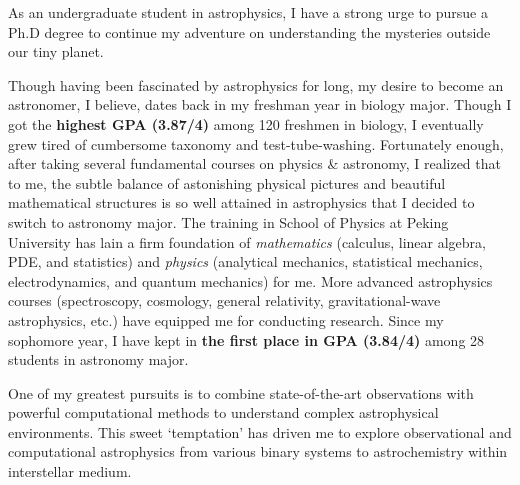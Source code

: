 As an undergraduate student in astrophysics, I have a strong urge to pursue a Ph.D degree to continue my adventure on understanding the mysteries outside our tiny planet. 

Though having been fascinated by astrophysics for long, my desire to become an astronomer, I believe, dates back in my freshman year in biology major. Though I got the \textbf{highest GPA (3.87/4)} among 120 freshmen in biology, I eventually grew tired of cumbersome taxonomy and test-tube-washing. Fortunately enough, after taking several fundamental courses on physics \& astronomy, I realized that to me, the subtle balance of astonishing physical pictures and beautiful mathematical structures is so well attained in astrophysics that I decided to switch to astronomy major. The training in School of Physics at Peking University has lain a firm foundation of \textit{mathematics} (calculus, linear algebra, PDE, and statistics) and \textit{physics} (analytical mechanics, statistical mechanics, electrodynamics, and quantum mechanics) for me. More advanced astrophysics courses (spectroscopy, cosmology, general relativity, gravitational-wave astrophysics, etc.) have equipped me for conducting research. Since my sophomore year, I have kept in \textbf{the first place in GPA (3.84/4)} among 28 students in astronomy major.

One of my greatest pursuits is to combine state-of-the-art observations with powerful computational methods to understand complex astrophysical environments. This sweet `temptation' has driven me to explore observational and computational astrophysics from various binary systems to astrochemistry within interstellar medium.



